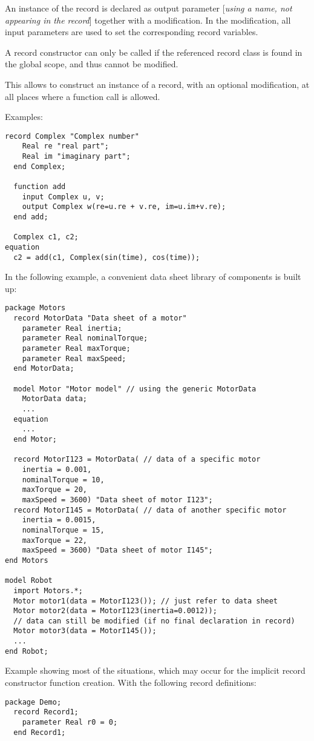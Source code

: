 An instance of the record is declared as output parameter {[}\emph{using
a name, not appearing in the record}{]} together with a modification. In
the modification, all input parameters are used to set the corresponding
record variables.

A record constructor can only be called if the referenced record class
is found in the global scope, and thus cannot be modified.

\begin{nonnormative}
This allows to construct an instance of a record, with an
optional modification, at all places where a function call is allowed.

Examples:
\begin{lstlisting}[language=modelica]
  record Complex "Complex number"
    Real re "real part";
    Real im "imaginary part";
  end Complex;

  function add
    input Complex u, v;
    output Complex w(re=u.re + v.re, im=u.im+v.re);
  end add;

  Complex c1, c2;
equation
  c2 = add(c1, Complex(sin(time), cos(time));
\end{lstlisting}

In the following example, a convenient data sheet library of
components is built up:
\begin{lstlisting}[language=modelica]
package Motors
  record MotorData "Data sheet of a motor"
    parameter Real inertia;
    parameter Real nominalTorque;
    parameter Real maxTorque;
    parameter Real maxSpeed;
  end MotorData;

  model Motor "Motor model" // using the generic MotorData
    MotorData data;
    ...
  equation
    ...
  end Motor;

  record MotorI123 = MotorData( // data of a specific motor
    inertia = 0.001,
    nominalTorque = 10,
    maxTorque = 20,
    maxSpeed = 3600) "Data sheet of motor I123";
  record MotorI145 = MotorData( // data of another specific motor
    inertia = 0.0015,
    nominalTorque = 15,
    maxTorque = 22,
    maxSpeed = 3600) "Data sheet of motor I145";
end Motors

model Robot
  import Motors.*;
  Motor motor1(data = MotorI123()); // just refer to data sheet
  Motor motor2(data = MotorI123(inertia=0.0012));
  // data can still be modified (if no final declaration in record)
  Motor motor3(data = MotorI145());
  ...
end Robot;
\end{lstlisting}

Example showing most of the situations, which may occur for the
implicit record constructor function creation. With the following record
definitions:
\begin{lstlisting}[language=modelica]
package Demo;
  record Record1;
    parameter Real r0 = 0;
  end Record1;


\end{lstlisting}
\end{nonnormative}
